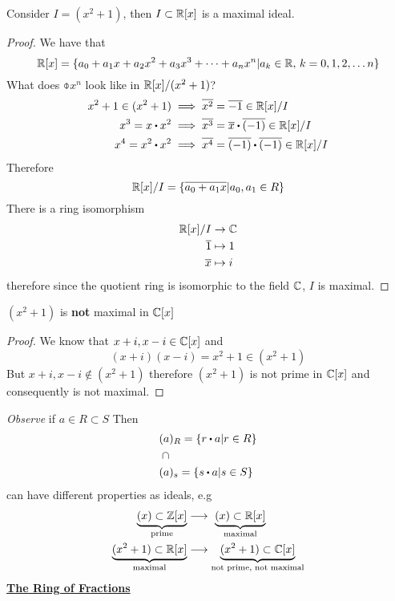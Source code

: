 \documentclass[../Main.tex]{subfiles}
\begin{document}
\begin{claim}
Consider $I=(x^2+1)$, then $I\subset \mathbb{R}[x]$ is a maximal ideal.
\end{claim}
\begin{proof}
	We have that
	\[\mathbb{R}[x] = \{a_0+a_1x+a_2x^2+a_3x^3+\dots+a_nx^n| a_k\in \mathbb{R}, \, k=0,1,2,\dots n\}\]
	What does $\obar{x^n}$ look like in $\mathbb{R}[x]/(x^2+1)$?
	\begin{align*}
		x^2+1 \in (x^2+1) &\implies \obar{x^2} = \obar{-1} \in \R[x]/I \\
		x^3 = x\rdot x^2 &\implies \obar{x^3} = \obar{x} \rdot \obar{(-1)} \in \R[x]/I\\
		x^4= x^2\rdot x^2 &\implies \obar{x^4} = \obar{(-1)} \rdot  \obar{(-1)} \in \R[x]/I
	\end{align*}
	Therefore
	\[\mathbb{R}[x]/I = \{\overline{a_0+a_1x}|a_0,a_1\in R\} \]
	There is a ring isomorphism
	\begin{align*}
	\mathbb{R}[x]/I &\to \mathbb{C} \\
	\overline{1} &\mapsto 1 \\
	\overline{x} &\mapsto i
	\end{align*}
	therefore since the quotient ring is isomorphic to the field $\mathbb{C}$, $I$ is maximal.
\end{proof}
\begin{claim}
	$(x^2+1)$ is \textbf{not} maximal in $\mathbb{C}[x]$
\end{claim}
\begin{proof}
	We know that $x+i,x-i \in \mathbb{C}[x]$ and
	\[(x+i)(x-i)=x^2+1\in (x^2+1)\]
	But $x+i,x-i \notin (x^2+1)$ therefore $(x^2+1)$ is not prime in $\mathbb{C}[x]$ and consequently is not maximal.
\end{proof}
\textit{Observe} if $a\in R\subset S$ Then
\begin{align*}
(a&)_R = \{r\rdot a | r\in R\}\\
\cap&\\
(a&)_s=\{s\rdot a|s\in S\}
\end{align*}
can have different properties as ideals, e.g
\begin{align*}
\underbrace{(x)\subset \mathbb{Z}[x]}_{\text{prime}} &\longrightarrow \,\,\underbrace{(x) \subset \mathbb{R}[x]}_{\text{maximal}}
\\
\underbrace{(x^2+1)\subset \mathbb{R}[x]}_{\text{maximal}} &\longrightarrow \underbrace{(x^2+1) \subset \mathbb{C}[x]}_{\text{not prime, not maximal}}
\end{align*}\newpage
\underline{\textbf{\Large The Ring of Fractions}}
\end{document}
